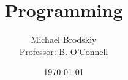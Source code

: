 


\title{Programming}
\date{\today}
\author{Michael Brodskiy\\ \small Professor: B. O'Connell}



\maketitle

